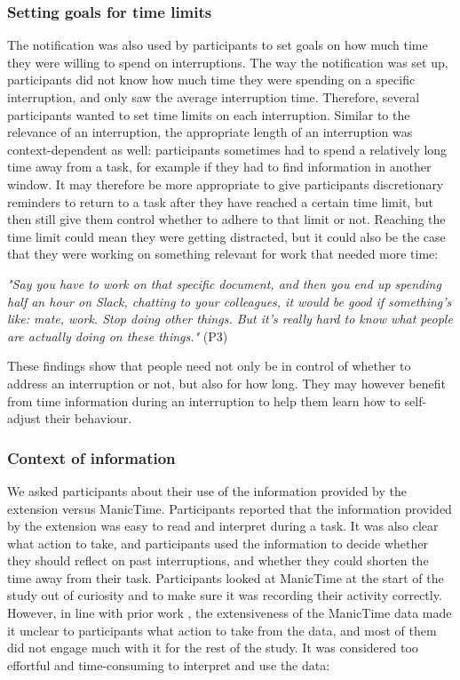 \subsubsection{Setting goals for time limits}
The notification was also used by participants to set goals on how much time they were willing to spend on interruptions. The way the notification was set up, participants did not know how much time they were spending on a specific interruption, and only saw the average interruption time. Therefore, several participants wanted to set time limits on each interruption. Similar to the relevance of an interruption, the appropriate length of an interruption was context-dependent as well: participants sometimes had to spend a relatively long time away from a task, for example if they had to find information in another window. It may therefore be more appropriate to give participants discretionary reminders to return to a task after they have reached a certain time limit, but then still give them control whether to adhere to that limit or not. Reaching the time limit could mean they were getting distracted, but it could also be the case that they were working on something relevant for work that needed more time: 

\textit{"Say you have to work on that specific document, and then you end up spending half an hour on Slack, chatting to your colleagues, it would be good if something's like: mate, work. Stop doing other things. But it’s really hard to know what people are actually doing on these things."} (P3)

These findings show that people need not only be in control of whether to address an interruption or not, but also for how long. They may however benefit from time information during an interruption to help them learn how to self-adjust their behaviour. 

\subsubsection{Context of information}
We asked participants about their use of the information provided by the extension versus ManicTime. Participants reported that the information provided by the extension was easy to read and interpret during a task. It was also clear what action to take, and participants used the information to decide whether they should reflect on past interruptions, and whether they could shorten the time away from their task. Participants looked at ManicTime at the start of the study out of curiosity and to make sure it was recording their activity correctly. However, in line with prior work \citep{Collins2014}, the extensiveness of the ManicTime data made it unclear to participants what action to take from the data, and most of them did not engage much with it for the rest of the study. It was considered too effortful and time-consuming to interpret and use the data:


